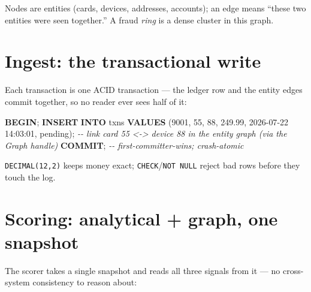\documentclass[
  11pt,
  openany]{book}
\newenvironment{Shaded}{}{}
\newcommand{\CommentTok}[1]{\textcolor[rgb]{0.38,0.63,0.69}{\textit{#1}}}
\newcommand{\ControlFlowTok}[1]{\textcolor[rgb]{0.00,0.44,0.13}{\textbf{#1}}}
\newcommand{\DecValTok}[1]{\textcolor[rgb]{0.25,0.63,0.44}{#1}}
\newcommand{\FloatTok}[1]{\textcolor[rgb]{0.25,0.63,0.44}{#1}}
\newcommand{\KeywordTok}[1]{\textcolor[rgb]{0.00,0.44,0.13}{\textbf{#1}}}
\newcommand{\NormalTok}[1]{#1}
\newcommand{\StringTok}[1]{\textcolor[rgb]{0.25,0.44,0.63}{#1}}
\begin{document}
Nodes are entities (cards, devices, addresses, accounts); an edge means
``these two entities were seen together.'' A fraud \emph{ring} is a
dense cluster in this graph.

\section{Ingest: the transactional
write}\label{ingest-the-transactional-write}

Each transaction is one ACID transaction --- the ledger row and the
entity edges commit together, so no reader ever sees half of it:

\begin{Shaded}
\begin{Highlighting}[]
\ControlFlowTok{BEGIN}\NormalTok{;}
  \KeywordTok{INSERT} \KeywordTok{INTO}\NormalTok{ txns }\KeywordTok{VALUES}\NormalTok{ (}\DecValTok{9001}\NormalTok{, }\DecValTok{55}\NormalTok{, }\DecValTok{88}\NormalTok{, }\FloatTok{249.99}\NormalTok{, }\StringTok{\textquotesingle{}2026{-}07{-}22 14:03:01\textquotesingle{}}\NormalTok{, }\StringTok{\textquotesingle{}pending\textquotesingle{}}\NormalTok{);}
  \CommentTok{{-}{-} link card 55 \textless{}{-}\textgreater{} device 88 in the entity graph (via the Graph handle)}
\KeywordTok{COMMIT}\NormalTok{;                       }\CommentTok{{-}{-} first{-}committer{-}wins; crash{-}atomic}
\end{Highlighting}
\end{Shaded}

\texttt{DECIMAL(12,2)} keeps money exact;
\texttt{CHECK}/\texttt{NOT\ NULL} reject bad rows before they touch the
log.

\section{Scoring: analytical + graph, one
snapshot}\label{scoring-analytical-graph-one-snapshot}

The scorer takes a single snapshot and reads all three signals from it
--- no cross-system consistency to reason about:
\end{document}
